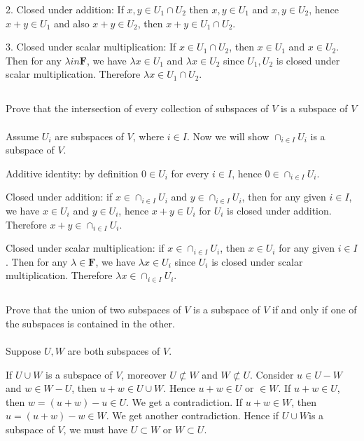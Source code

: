 \documentclass[a4paper]{article}
\begin{document}
2. Closed under addition: If $x, y \in U_1 \cap U_2$ then $x, y\in U_1$ and $x, y\in U_2$, hence
$x + y \in U_1$ and also $x + y \in U_2$, then $x+y\in U_1 \cap U_2$.

3. Closed under scalar multiplication: If $x\in U_1\cap U_2$, then $x \in U_1$ and $x \in U_2$. Then for any $\lambda in \mathbf{F}$,
we have $\lambda x\in U_1$ and $\lambda x \in U_2$ since $U_1, U_2$ is closed under scalar multiplication. Therefore $\lambda x \in U_1 \cap U_2$.

\subsection{}
Prove that the intersection of every collection of subspaces of $V$ is a subspace of $V$
\paragraph{}
Assume $U_i$ are subspaces of $V$, where $i\in I$. Now we will show $\cap_{i\in I}U_i$ is a subspace of $V$.

Additive identity: by definition $0\in U_i$ for every $i\in I$, hence $0\in \cap_{i\in I}U_i$.

Closed under addition: if $x\in \cap_{i\in I}U_i$ and $y\in \cap_{i\in I}U_i$, then for any given $i\in I$,
we have $x\in U_i$ and $y\in U_i$, hence $x+y\in U_i$ for $U_i$ is closed under addition. Therefore $x+y\in \cap_{i\in I}U_i$.

Closed under scalar multiplication: if $x\in \cap_{i\in I}U_i$, then $x\in U_i$ for any given $i\in I$. Then for any $\lambda\in\mathbf{F}$,
we have $\lambda x\in U_i$ since $U_i$ is closed under scalar multiplication. Therefore $\lambda x\in \cap_{i\in I}U_i$.

\subsection{}
Prove that the union of two subspaces of $V$ is a subspace of $V$ if and only if one of the subspaces is contained in the other.
\paragraph{}
Suppose $U,W$ are both subspaces of $V$.

If $U \cup W $ is a subspace of $V$, moreover $U \not\subset W$ and $W\not\subset U$. Consider $u \in U - W$ and $w \in W - U$, then $u + w\in U \cup W$.
Hence $u+w\in U \text{ or } \in W$. If $u+w \in U$, then $w = (u+w) - u \in U$. We get a contradiction. If $u+w \in W$, then $u = (u+w)-w\in W$.
We get another contradiction. Hence if $U\cup W$is a subspace of $V$, we must have $U\subset W$ or $W\subset U$.
\end{document}

